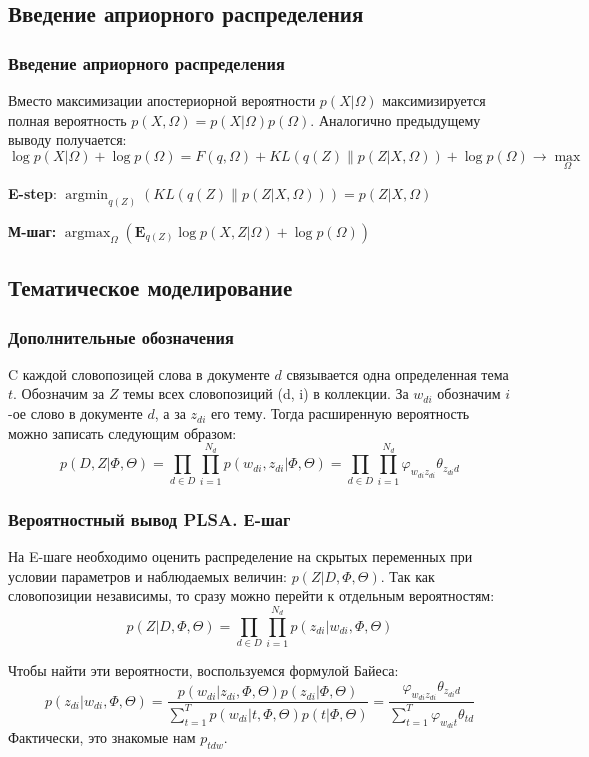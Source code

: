 \documentclass[utf8]{beamer}
\DeclareMathOperator{\argmax}{argmax}
\DeclareMathOperator{\argmin}{argmin}
\renewcommand{\phi}{\varphi}
\begin{document}
	\subsection{Введение априорного распределения}
	\begin{frame}	
	\frametitle{Введение априорного распределения}
	Вместо максимизации апостериорной вероятности $p(X|\Omega)$ максимизируется полная  вероятность $p(X, \Omega)= p(X|\Omega) p(\Omega)$. Аналогично предыдущему выводу получается:
\[
\log p(X|\Omega) + \log p(\Omega) = F(q, \Omega) + KL(q(Z)\|p(Z|X,\Omega)) + \log p(\Omega) \to \max\limits_{\Omega}
\]

\textbf{E-step}: $\argmin_{q(Z)} \left( KL(q(Z)\|p(Z|X,\Omega))\right) = p(Z|X, \Omega)$

\medskip

\textbf{М-шаг:} $\argmax_{\Omega} \left( \mathbf{E}_{q(Z)} \log p(X, Z|\Omega) + \log p(\Omega)\right)$ 
	\end{frame}


	\subsection{Тематическое моделирование}

 	\begin{frame}
		\frametitle{Дополнительные обозначения}  
		C каждой словопозицей слова в документе $d$ связывается одна определенная тема $t$. Обозначим за $Z$ темы всех словопозиций (d, i) в коллекции. За $w_{di}$ обозначим $i$-ое слово в документе $d$, а за $z_{di}$ его тему. Тогда расширенную вероятность можно записать следующим образом:
\[
p(D, Z|\Phi, \Theta) = \prod\limits_{d \in D} \prod\limits_{i=1}^{N_d} p(w_{di}, z_{di}|\Phi, \Theta) = \prod\limits_{d \in D} \prod\limits_{i=1}^{N_d} \phi_{w_{di}z_{di}}\theta_{z_{di}d}
\]
	\end{frame}
	
 	\begin{frame}
		\frametitle{Вероятностный вывод PLSA. Е-шаг}   
На E-шаге необходимо оценить распределение на скрытых переменных при условии параметров и  наблюдаемых величин: $p(Z|D,\Phi,\Theta)$. Так как словопозиции независимы, то сразу можно перейти к отдельным вероятностям:
\[
p(Z|D,\Phi, \Theta) = \prod\limits_{d \in D} \prod\limits_{i=1}^{N_d} p(z_{di}|w_{di}, \Phi, \Theta)
\]

Чтобы найти эти вероятности, воспользуемся формулой Байеса:
\[
p(z_{di}|w_{di}, \Phi, \Theta) = \frac{p(w_{di}|z_{di}, \Phi, \Theta)p(z_{di}|\Phi,\Theta)}{\sum_{t=1}^T p(w_{di}|t, \Phi, \Theta)p(t|\Phi,\Theta)}
= \frac{\phi_{w_{di} z_{di}} \theta_{z_{di} d}}{\sum_{t=1}^T \phi_{w_{di}t} \theta_{td}}
\]
Фактически, это знакомые нам $p_{tdw}$.
	\end{frame}
	
\end{document}
